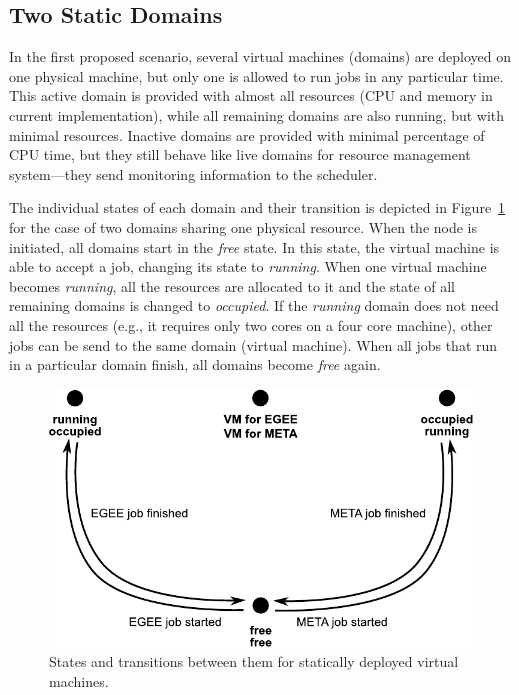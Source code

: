 \documentclass[a4paper]{article}
\begin{document}
\subsection{Two Static Domains}

In the first proposed scenario, several virtual machines (domains) are
deployed on one physical machine, but only one is allowed to run jobs in any
particular time. This active domain is provided with almost all resources (CPU
and memory in current implementation), while all remaining domains are also
running, but with minimal resources. Inactive domains are provided with
minimal percentage of CPU time, but they still behave like live domains for
resource management system---they send monitoring information to the
scheduler.

The individual states of each domain and their transition is depicted in
Figure~\ref{fig:twoVMs} for the case of two domains sharing one physical
resource. When the node is initiated, all domains start in the \emph{free}
state. In this state, the virtual machine is able to accept a job, changing
its state to \emph{running}. When one virtual machine becomes \emph{running},
all the resources are allocated to it and the state of all remaining domains
is changed to \emph{occupied}. If the \emph{running} domain does not need all
the resources (e.g., it requires only two cores on a four core machine), other
jobs can be send to the same domain (virtual machine). When all jobs that run
in a particular domain finish, all domains become \textit{free} again.

\begin{figure}[tb]
    \begin{center}
    \includegraphics[width=.6\textwidth]{twoVMs}
    \end{center}
    \caption{States and transitions between them for statically deployed
        virtual machines.}
    \label{fig:twoVMs}
\end{figure}
\end{document}
